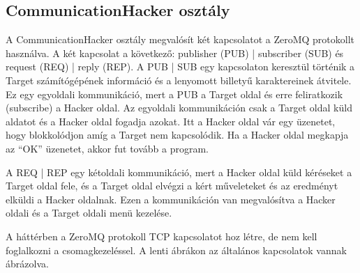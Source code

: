 \documentclass[12pt,a4paper,oneside]{report}
\begin{document}
\subsection{CommunicationHacker osztály}\label{subsubsec:serverclass}
A CommunicationHacker osztály megvalósít két kapcsolatot a ZeroMQ protokollt használva. A két kapcsolat a következő: publisher (PUB) | subscriber (SUB) és request (REQ) | reply (REP). A PUB | SUB egy kapcsolaton keresztül történik a Target számítógépének információ és a lenyomott billetyű karaktereinek átvitele. Ez egy egyoldali kommunikáció, mert a PUB a Target oldal és erre feliratkozik (subscribe) a Hacker oldal. Az egyoldali kommunikáción csak a Target oldal küld aldatot és a Hacker oldal fogadja azokat. Itt a Hacker oldal vár egy üzenetet, hogy blokkolódjon amíg a Target nem kapcsolódik. Ha a Hacker oldal megkapja az ``OK'' üzenetet, akkor fut tovább a program.

A REQ | REP egy kétoldali kommunikáció, mert a Hacker oldal küld kéréseket a Target oldal fele, és a Target oldal elvégzi a kért műveleteket és az eredményt elküldi a Hacker oldalnak. Ezen a kommunikáción van megvalósítva a Hacker oldali és a Target oldali menü kezelése.

A háttérben a ZeroMQ protokoll TCP kapcsolatot hoz létre, de nem kell foglalkozni a csomagkezeléssel. A lenti ábrákon az általános kapcsolatok vannak ábrázolva.
\end{document}

